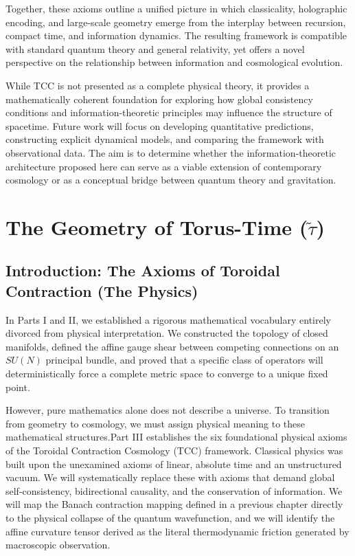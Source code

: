 \documentclass[12pt,openany]{book}
\theoremstyle{plain}
\theoremstyle{definition}
\theoremstyle{remark}
\begin{document}
Together, these axioms outline a unified picture in which classicality,
holographic encoding, and large-scale geometry emerge from the interplay
between recursion, compact time, and information dynamics. The resulting
framework is compatible with standard quantum theory and general relativity,
yet offers a novel perspective on the relationship between information and
cosmological evolution.

While TCC is not presented as a complete physical theory, it provides a
mathematically coherent foundation for exploring how global consistency
conditions and information-theoretic principles may influence the structure of
spacetime. Future work will focus on developing quantitative predictions,
constructing explicit dynamical models, and comparing the framework with
observational data. The aim is to determine whether the information-theoretic
architecture proposed here can serve as a viable extension of contemporary
cosmology or as a conceptual bridge between quantum theory and gravitation.

\part{The Geometry of Torus-Time ($\tilde{\tau}$)}

\chapter{Introduction: The Axioms of Toroidal Contraction (The Physics)}
In Parts I and II, we established a rigorous mathematical vocabulary entirely divorced from physical interpretation. We constructed the topology of closed manifolds, defined the affine gauge shear between competing connections on an $SU(N)$ principal bundle, and proved that a specific class of operators will deterministically force a complete metric space to converge to a unique fixed point.

However, pure mathematics alone does not describe a universe. To transition from geometry to cosmology, we must assign physical meaning to these mathematical structures.Part III establishes the six foundational physical axioms of the Toroidal Contraction Cosmology (TCC) framework. Classical physics was built upon the unexamined axioms of linear, absolute time and an unstructured vacuum. We will systematically replace these with axioms that demand global self-consistency, bidirectional causality, and the conservation of information. We will map the Banach contraction mapping defined in a previous chapter directly to the physical collapse of the quantum wavefunction, and we will identify the affine curvature tensor derived as the literal thermodynamic friction generated by macroscopic observation.
\end{document}
